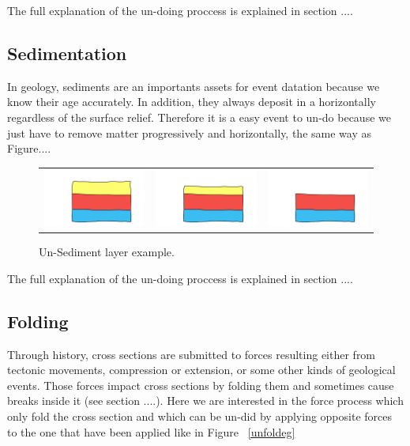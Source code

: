 \documentclass[12pt, a4paper]{memoir} %
\begin{document}
The full explanation of the un-doing proccess is explained in section ....

\subsection{Sedimentation}
In geology, sediments are an importants assets for event datation because we know their age accurately. In addition, they always deposit in a horizontally regardless of the surface relief. Therefore it is a easy event to un-do because we just have to remove matter progressively and horizontally, the same way as Figure....
\begin{figure}[htb]
\centering
\begin{tabular}{@{}ccc@{}}
\includegraphics[width=.35\textwidth]{unSedimentDescription0.png}&
\includegraphics[width=.35\textwidth]{unSedimentDescription1.png}&
\includegraphics[width=.35\textwidth]{unSedimentDescription2.png}\\
\end{tabular}
\caption{Un-Sediment layer example.}
\end{figure}

The full explanation of the un-doing proccess is explained in section ....

\subsection{Folding}
Through history, cross sections are submitted to forces resulting either from tectonic movements, compression or extension, or some other kinds of geological events. Those forces impact cross sections by folding them and sometimes cause breaks inside it (see section ....). Here we are interested in the force process which only fold the cross section and which can be un-did by applying opposite forces to the one that have been applied like in Figure ~\ref{unfoldeg}
\end{document}
